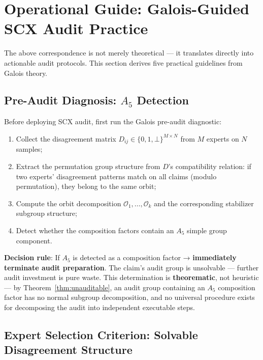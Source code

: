 \documentclass[10pt,a4paper]{article}
\theoremstyle{remark}
\begin{document}
\section{Operational Guide: Galois-Guided SCX Audit Practice}

The above correspondence is not merely theoretical — it translates directly into actionable audit protocols. This section derives five practical guidelines from Galois theory.

\subsection{Pre-Audit Diagnosis: $A_5$ Detection}

Before deploying SCX audit, first run the Galois pre-audit diagnostic:

\begin{enumerate}[label=Step \arabic*:]
  \item Collect the disagreement matrix $D_{ij} \in \{0,1,\bot\}^{M\times N}$ from $M$ experts on $N$ samples;
  \item Extract the permutation group structure from $D$'s compatibility relation: if two experts' disagreement patterns match on all claims (modulo permutation), they belong to the same orbit;
  \item Compute the orbit decomposition $\mathcal{O}_1, \ldots, \mathcal{O}_k$ and the corresponding stabilizer subgroup structure;
  \item Detect whether the composition factors contain an $A_5$ simple group component.
\end{enumerate}

\textbf{Decision rule}: If $A_5$ is detected as a composition factor → \textbf{immediately terminate audit preparation}. The claim's audit group is unsolvable — further audit investment is pure waste. This determination is \textbf{theorematic}, not heuristic — by Theorem~\ref{thm:unauditable}, an audit group containing an $A_5$ composition factor has no normal subgroup decomposition, and no universal procedure exists for decomposing the audit into independent executable steps.

\subsection{Expert Selection Criterion: Solvable Disagreement Structure}
\end{document}
